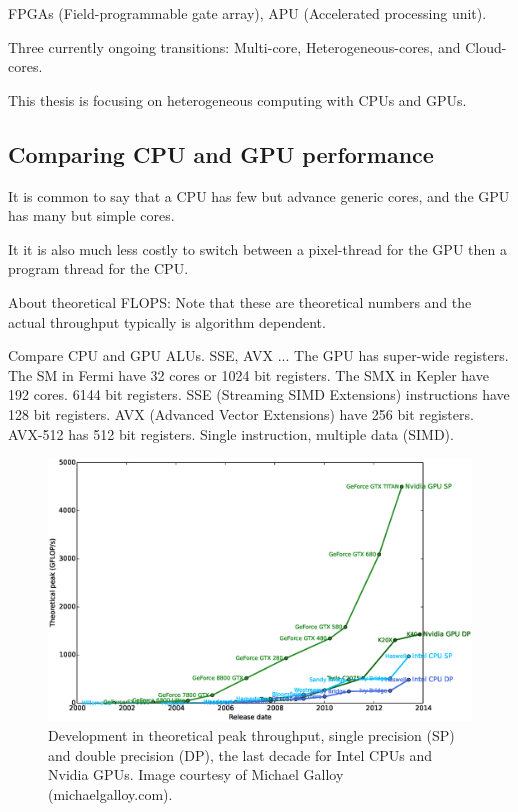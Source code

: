 FPGAs (Field-programmable gate array), APU (Accelerated processing unit).

Three currently ongoing transitions: Multi-core, Heterogeneous-cores, and Cloud-cores.

This thesis is focusing on heterogeneous computing with CPUs and GPUs. 

\subsection{Comparing CPU and GPU performance}\label{sec:cpu_vs_gpu}
It is common to say that a CPU has few but advance generic cores, and the GPU has many but simple cores.

It it is also much less costly to switch between a pixel-thread for the GPU then a program thread for the CPU.  

About theoretical FLOPS: Note that these are theoretical numbers and the actual throughput typically is algorithm dependent.

Compare CPU and GPU ALUs. SSE, AVX ... The GPU has super-wide registers. The SM in Fermi have 32 cores or 1024 bit registers. The SMX in Kepler have 192 cores. 6144 bit registers. SSE (Streaming SIMD Extensions) instructions have 128 bit registers. AVX (Advanced Vector Extensions) have 256 bit registers. AVX-512 has 512 bit registers. Single instruction, multiple data (SIMD).

\begin{figure}
\centering
\includegraphics[width=\textwidth]{img/cpu-vs-gpu.eps}
\caption{Development in theoretical peak throughput, single precision (SP) and double precision (DP), the last decade for Intel CPUs and Nvidia GPUs. Image courtesy of Michael Galloy (michaelgalloy.com).}
\label{fig:cpu_vs_gpu}
\end{figure}

